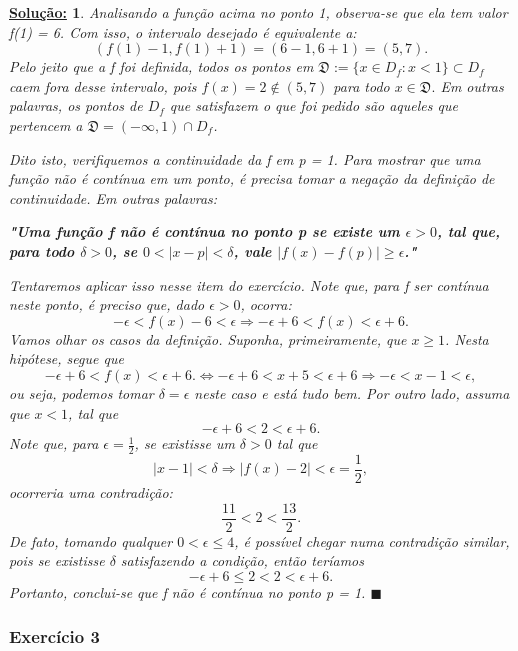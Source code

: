 \documentclass{article}
\newtheorem*{sol*}{\underline{Solu\c c\~ao:}}
\renewcommand\qedsymbol{$\blacksquare$}
\begin{document}
\begin{sol*}
	Analisando a fun\c c\~ao acima no ponto 1, observa-se que ela tem valor f(1) = 6. Com isso, o intervalo desejado \'e equivalente a:
	$$
		(f(1) - 1, f(1) + 1) = (6 - 1, 6 + 1) = (5, 7).
	$$
	Pelo jeito que a f foi definida, todos os pontos em $\mathfrak{D}:=\{x\in{D_{f}}: x < 1\} \subset{D_{f}}$ caem fora desse intervalo, pois $f(x) = 2\notin{(5, 7)}$ para todo $x\in\mathfrak{D}.$ Em outras palavras, os pontos de $D_f$ que satisfazem o que foi pedido s\~ao aqueles que pertencem a $\mathfrak{D} = (-\infty, 1)\cap{D_{f}}$.

	Dito isto, verifiquemos a continuidade da f em p = 1. Para mostrar que uma fun\c c\~ao n\~ao \'e cont\'inua em um ponto, \'e precisa tomar a nega\c c\~ao da defini\c c\~ao de continuidade. Em outras palavras:

	\textbf{ "Uma fun\c c\~ao f n\~ao \'e cont\'inua no ponto p se existe um $\epsilon > 0$, tal que, para todo $\delta > 0$, se $0 < |x - p| < \delta$, vale $|f(x) - f(p)|\geq\epsilon$."}

	Tentaremos aplicar isso nesse item do exerc\'icio. Note que, para f ser cont\'inua neste ponto, \'e preciso que, dado $\epsilon > 0$, ocorra:
	$$
		-\epsilon < f(x) - 6 < \epsilon \Rightarrow -\epsilon + 6 < f(x) < \epsilon + 6.
	$$
	Vamos olhar os casos da defini\c c\~ao. Suponha, primeiramente, que $x\geq 1$. Nesta hip\'otese, segue que
	$$
		-\epsilon + 6 < f(x) < \epsilon + 6. \Leftrightarrow -\epsilon + 6 < x + 5 < \epsilon + 6 \Rightarrow -\epsilon < x - 1 < \epsilon,
	$$
	ou seja, podemos tomar $\delta = \epsilon$ neste caso e est\'a tudo bem. Por outro lado, assuma que $x < 1$, tal que
	$$
		-\epsilon + 6 < 2 < \epsilon + 6.
	$$
	Note que, para $\epsilon = \frac{1}{2}$, se existisse um $\delta > 0$ tal que
	$$
		|x - 1| < \delta \Rightarrow |f(x) - 2| < \epsilon = \frac{1}{2},
	$$
	ocorreria uma contradi\c c\~ao:
	$$
		\frac{11}{2} < 2 < \frac{13}{2}.
	$$
	De fato, tomando qualquer $0 < \epsilon \leq 4$, \'e poss\'ivel chegar numa contradi\c c\~ao similar, pois se existisse $\delta$ satisfazendo a condi\c c\~ao, ent\~ao ter\'iamos
	$$
		-\epsilon + 6 \leq 2 < 2 < \epsilon + 6.
	$$
	Portanto, conclui-se que f n\~ao \'e cont\'inua no ponto p = 1.
	\qedsymbol
\end{sol*}

\subsubsection{Exerc\'icio 3}
\end{document}
